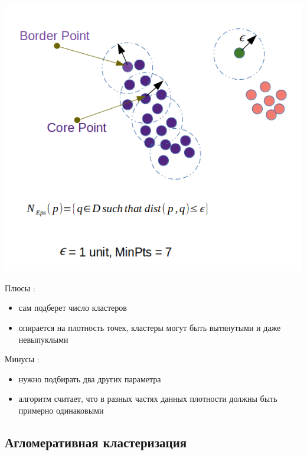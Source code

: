 \begin{center}
    \includegraphics[scale=0.6]{tickets/pictures/dbscan.png}
\end{center}

Плюсы :
\begin{itemize}
    \item сам подберет число кластеров
    \item опирается на плотность точек, кластеры могут быть вытянутыми и даже невыпуклыми
\end{itemize}

Минусы :
\begin{itemize}
    \item нужно подбирать два других параметра
    \item алгоритм считает, что в разных частях данных плотности должны быть примерно одинаковыми
\end{itemize}

\subsection{Агломеративная кластеризация}

